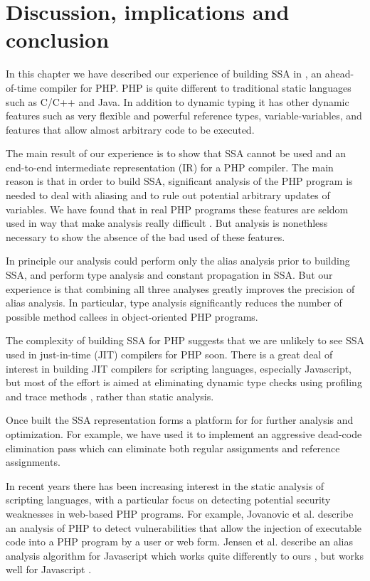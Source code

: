 \section{Discussion, implications and conclusion}
In this chapter we have described our experience of building SSA in
\phc, an ahead-of-time compiler for PHP. PHP is quite different to
traditional static languages such as C/C++ and Java. In addition to
dynamic typing it has other dynamic features such as very flexible and
powerful reference types, variable-variables, and features that allow
almost arbitrary code to be executed. 

The main result of our experience is to show that SSA cannot be used
and an end-to-end intermediate representation (IR) for a PHP
compiler. The main reason is that in order to build SSA, significant
analysis of the PHP program is needed to deal with aliasing and to
rule out potential arbitrary updates of variables. We have found that
in real PHP programs these features are seldom used in way that make
analysis really difficult \cite{Biggar2010}. But analysis is
nonethless necessary to show the absence of the bad used of these
features.

In principle our analysis could perform only the alias analysis prior
to building SSA, and perform type analysis and constant propagation in
SSA. But our experience is that combining all three analyses greatly
improves the precision of alias analysis.  In particular, type
analysis significantly reduces the number of possible method callees
in object-oriented PHP programs.

The complexity of building SSA for PHP suggests that we are unlikely
to see SSA used in just-in-time (JIT) compilers for PHP soon. There is
a great deal of interest in building JIT compilers for scripting
languages, especially Javascript, but most of the effort is aimed at
eliminating dynamic type checks using profiling and trace methods
\cite{Gal:2009}, rather than static analysis.

Once built the SSA representation forms a platform for for further
analysis and optimization. For example, we have used it to implement
an aggressive dead-code elimination pass which can eliminate both
regular assignments and reference assignments.

In recent years there has been increasing interest in the static
analysis of scripting languages, with a particular focus on detecting
potential security weaknesses in web-based PHP programs. For example,
Jovanovic et al. \cite{Jovanovic06pixy:a} describe an analysis of PHP
to detect vulnerabilities that allow the injection of executable code
into a PHP program by a user or web form. Jensen et al.  describe an
alias analysis algorithm for Javascript which works quite differently
to ours \cite{Biggar2010}, but works well for Javascript
\cite{Jensen+2009}.

